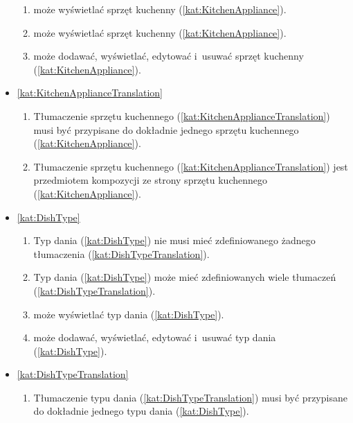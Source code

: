 \begin{itemize}[label={\textbf{Reguły dla}}, wide, labelwidth=!, labelindent=0pt]
\begin{enumerate}[label={\textbf{REG/3/\protect\twodigits{\arabic{enumi}}}}, wide, labelwidth=!, align=left, leftmargin=3cm, resume]
        \item {} może wyświetlać sprzęt kuchenny (\ref{kat:KitchenAppliance}).
        \item {} może wyświetlać sprzęt kuchenny (\ref{kat:KitchenAppliance}).
        \item {} może dodawać, wyświetlać, edytować i~usuwać sprzęt kuchenny (\ref{kat:KitchenAppliance}).
    \end{enumerate}
    \item\ref{kat:KitchenApplianceTranslation}\mynobreakpar
    \begin{enumerate}[label={\textbf{REG/3/\protect\twodigits{\arabic{enumi}}}}, wide, labelwidth=!, align=left, leftmargin=3cm, resume]
        \item Tłumaczenie sprzętu kuchennego (\ref{kat:KitchenApplianceTranslation}) musi być przypisane do dokładnie jednego sprzętu kuchennego (\ref{kat:KitchenAppliance}).
        \item Tłumaczenie sprzętu kuchennego (\ref{kat:KitchenApplianceTranslation}) jest przedmiotem kompozycji ze strony sprzętu kuchennego (\ref{kat:KitchenAppliance}).
    \end{enumerate}
    \item\ref{kat:DishType}\mynobreakpar
    \begin{enumerate}[label={\textbf{REG/3/\protect\twodigits{\arabic{enumi}}}}, wide, labelwidth=!, align=left, leftmargin=3cm, resume]
        \item Typ dania (\ref{kat:DishType}) nie musi mieć zdefiniowanego żadnego tłumaczenia (\ref{kat:DishTypeTranslation}).
        \item Typ dania (\ref{kat:DishType}) może mieć zdefiniowanych wiele tłumaczeń (\ref{kat:DishTypeTranslation}).
        \item {} może wyświetlać typ dania (\ref{kat:DishType}).
        \item {} może dodawać, wyświetlać, edytować i~usuwać typ dania (\ref{kat:DishType}).
    \end{enumerate}
    \item\ref{kat:DishTypeTranslation}\mynobreakpar
    \begin{enumerate}[label={\textbf{REG/3/\protect\twodigits{\arabic{enumi}}}}, wide, labelwidth=!, align=left, leftmargin=3cm, resume]
        \item Tłumaczenie typu dania (\ref{kat:DishTypeTranslation}) musi być przypisane do dokładnie jednego typu dania (\ref{kat:DishType}).

\end{enumerate}
\end{itemize}
